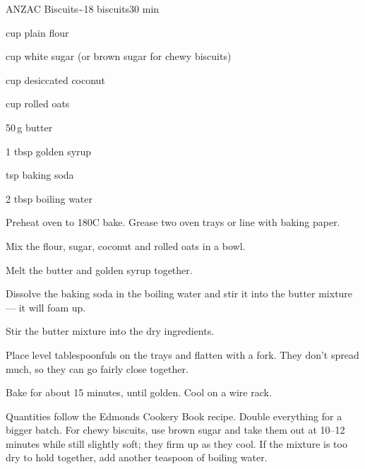 \begin{recipebox}{ANZAC Biscuits}{\textasciitilde18 biscuits}{30 min}
\begin{ingredients}
  \item {} cup plain flour
  \item {} cup white sugar (or brown sugar for chewy biscuits)
  \item {} cup desiccated coconut
  \item {} cup rolled oats
  \item 50\,g butter
  \item 1 tbsp golden syrup
  \item {} tsp baking soda
  \item 2 tbsp boiling water
\end{ingredients}

\begin{method}
  \item Preheat oven to 180\degree C bake. Grease two oven trays or line with baking paper.
  \item Mix the flour, sugar, coconut and rolled oats in a bowl.
  \item Melt the butter and golden syrup together.
  \item Dissolve the baking soda in the boiling water and stir it into the butter mixture --- it will foam up.
  \item Stir the butter mixture into the dry ingredients.
  \item Place level tablespoonfuls on the trays and flatten with a fork. They don't spread much, so they can go fairly close together.
  \item Bake for about 15 minutes, until golden. Cool on a wire rack.
\end{method}

\begin{notes}
Quantities follow the Edmonds Cookery Book recipe. Double everything for a bigger batch.
For chewy biscuits, use brown sugar and take them out at 10--12 minutes while still slightly soft; they firm up as they cool.
If the mixture is too dry to hold together, add another teaspoon of boiling water.
\end{notes}
\end{recipebox}
